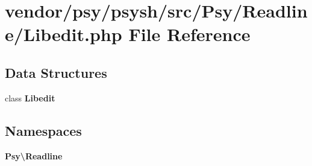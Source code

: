 \section{vendor/psy/psysh/src/\+Psy/\+Readline/\+Libedit.php File Reference}
\label{_libedit_8php}
\subsection*{Data Structures}
\begin{DoxyCompactItemize}
\item 
class {\bf Libedit}
\end{DoxyCompactItemize}
\subsection*{Namespaces}
\begin{DoxyCompactItemize}
\item 
 {\bf Psy\textbackslash{}\+Readline}
\end{DoxyCompactItemize}
